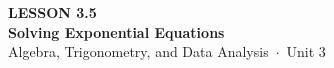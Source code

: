 \documentclass[aspectratio=169, 11pt]{beamer}
\begin{document}
{
\begin{frame}[plain]
  \vspace{2.8cm}\hspace{0.55cm}%
  \begin{minipage}{0.9\textwidth}
    {\color{goldacc}\bfseries\small LESSON 3.5}\\[0.5cm]
    {\color{white}\bfseries\LARGE Solving Exponential Equations}\\[1.2cm]
    {\color{mistmid}\small Algebra, Trigonometry, and Data Analysis~$\cdot$~Unit 3}
  \end{minipage}
\end{frame}
}

\begin{frame}[t, plain]
\end{frame}
\end{document}
